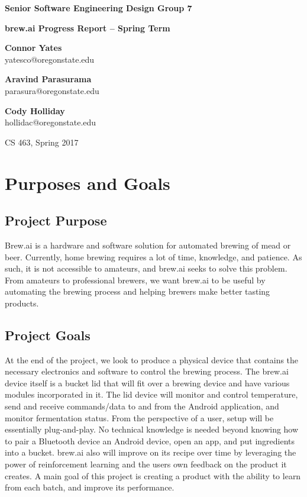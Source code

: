 \documentclass[draftclsnofoot,onecolumn,letterpaper,10pt]{IEEEtran}
\begin{document}
\begin{center}
	{\huge\textbf{Senior Software Engineering Design Group 7}}
	\vspace{1cm}

	{\Huge\textbf{brew.ai Progress Report -- Spring Term}}

	\vspace{2cm}
	\textbf{Connor Yates}\\yatesco@oregonstate.edu

	\textbf{Aravind Parasurama}\\parasura@oregonstate.edu

	\textbf{Cody Holliday}\\hollidac@oregonstate.edu

	\vspace{2cm}
	{\Large CS 463, Spring 2017}
	\vspace{1cm}
\end{center}

\begin{abstract}

\end{abstract}

\newpage
\tableofcontents
\newpage

\section{Purposes and Goals}
\subsection{Project Purpose}
Brew.ai is a hardware and software solution for automated brewing of mead or beer.
Currently, home brewing requires a lot of time, knowledge, and patience.
As such, it is not accessible to amateurs, and brew.ai seeks to solve this problem.
From amateurs to professional brewers, we want brew.ai to be useful by automating the brewing process and helping brewers make better tasting products.

\subsection{Project Goals}
At the end of the project, we look to produce a physical device that contains the necessary electronics and software to control the brewing process.
The brew.ai device itself is a bucket lid that will fit over a brewing device and have various modules incorporated in it.
The lid device will monitor and control temperature, send and receive commands/data to and from the Android application, and monitor fermentation status.
From the perspective of a user, setup will be essentially plug-and-play.
No technical knowledge is needed beyond knowing how to pair a Bluetooth device an Android device, open an app, and put ingredients into a bucket.
brew.ai also will improve on its recipe over time by leveraging the power of reinforcement learning and the users own feedback on the product it creates.
A main goal of this project is creating a product with the ability to learn from each batch, and improve its performance.
\end{document}
